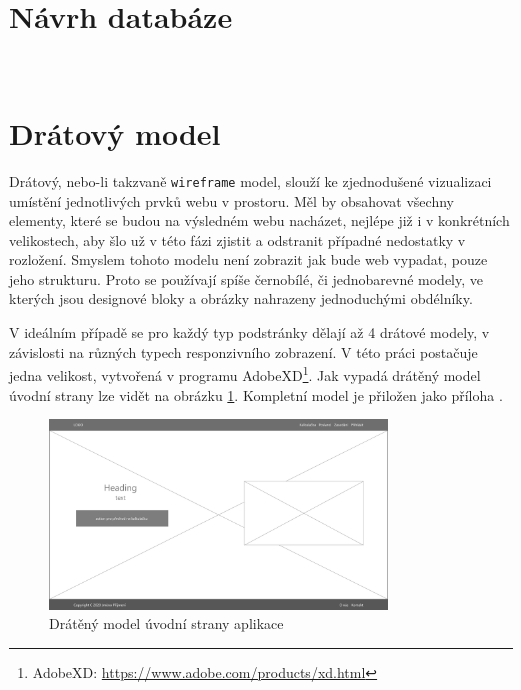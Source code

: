 \section{Návrh databáze}
\\


\section{Drátový model}
\label{section:wireframe}
Drátový, nebo-li takzvaně \texttt{wireframe} model, slouží ke zjednodušené vizualizaci umístění jednotlivých prvků webu v prostoru. Měl by obsahovat všechny elementy, které se budou na výsledném webu nacházet, nejlépe již i v konkrétních velikostech, aby šlo už v této fázi zjistit a odstranit případné nedostatky v rozložení. Smyslem tohoto modelu není zobrazit jak bude web vypadat, pouze jeho strukturu. Proto se používají spíše černobílé, či jednobarevné modely, ve kterých jsou designové bloky a obrázky nahrazeny jednoduchými obdélníky.
\par V ideálním případě se pro každý typ podstránky dělají až 4 drátové modely, v závislosti na různých typech responzivního zobrazení. V této práci postačuje jedna velikost, vytvořená v programu AdobeXD\footnote{AdobeXD: \url{https://www.adobe.com/products/xd.html}}. Jak vypadá drátěný model úvodní strany lze vidět na obrázku \ref{fig:wireframe-homepage}. Kompletní model je přiložen jako příloha . 

\begin{figure}
    \centering
    \includegraphics[width=0.8\textwidth]{obrazky-figures/wireframe-homepage.pdf}
    \caption{Drátěný model úvodní strany aplikace}
    \label{fig:wireframe-homepage}
\end{figure}



